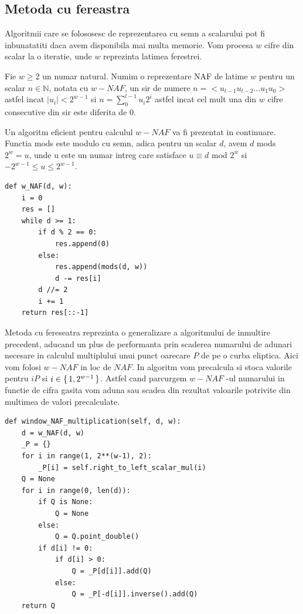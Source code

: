 \subsection{Metoda cu fereastra}
Algoritmii care se folososesc de reprezentarea cu semn a scalarului pot fi inbunatatiti daca avem disponibila mai multa memorie. Vom procesa $w$ cifre din scalar la o iteratie, unde $w$ reprezinta latimea ferestrei.

\begin{dfn}
Fie $w\geq 2$ un numar natural. Numim o reprezentare NAF de latime $w$ pentru un scalar $n\in\mathbb{N}$, notata cu $w-NAF$, un sir de numere $n = <u_{l-1}u_{l-2}...u_1u_0>$ astfel incat $|u_i| < 2^{w-1}$ si $n = \sum_{0}^{l-1}u_i2^i$ astfel incat cel mult una din $w$ cifre consecutive din sir este diferita de 0.
\end{dfn}

Un algoritm eficient pentru calculul $w-NAF$ va fi prezentat in continuare. Functia mods este modulo cu semn, adica pentru un scalar $d$, avem $d$ mods $2^w=u$, unde u este un numar intreg care satisface $u\equiv d$ mod $2^w$ si $-2^{w-1}\leq u\leq 2^{w-1}$.

\begin{lstlisting}
def w_NAF(d, w):
    i = 0
    res = []
    while d >= 1:
        if d % 2 == 0:
            res.append(0)
        else:
            res.append(mods(d, w))
            d -= res[i]
        d //= 2
        i += 1
    return res[::-1]
\end{lstlisting}

Metoda cu fereseatra reprezinta o generalizare a algoritmului de inmultire precedent, aducand un plus de performanta prin scaderea numarului de adunari necesare in calculul multiplului unui punct oarecare $P$ de pe o curba eliptica. Aici vom folosi $w-NAF$ in loc de $NAF$. In algoritm vom precalcula si stoca valorile pentru $iP$ si $i\in\set{1, 2^{w-1}}$. Astfel cand parcurgem $w-NAF$ -ul numarului in functie de cifra gasita vom aduna sau scadea din rezultat valoarile potrivite din multimea de valori precalculate.

\begin{lstlisting}
def window_NAF_multiplication(self, d, w):
    d = w_NAF(d, w)
    _P = {}
    for i in range(1, 2**(w-1), 2):
        _P[i] = self.right_to_left_scalar_mul(i)
    Q = None
    for i in range(0, len(d)):
        if Q is None:
            Q = None
        else:
            Q = Q.point_double()
        if d[i] != 0:
            if d[i] > 0:
                Q = _P[d[i]].add(Q)
            else:
                Q = _P[-d[i]].inverse().add(Q)
    return Q
\end{lstlisting}

